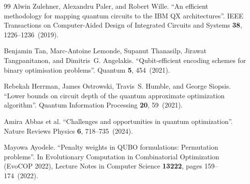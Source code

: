 \begin{thebibliography}{99}
Alwin Zulehner, Alexandru Paler, and Robert Wille.
\newblock ``An efficient methodology for mapping quantum circuits to the IBM QX architectures''.
\newblock IEEE Transactions on Computer-Aided Design of Integrated Circuits and Systems {\bf 38}, 1226--1236~(2019).

Benjamin Tan, Marc-Antoine Lemonde, Supanut Thanasilp, Jirawat Tangpanitanon, and Dimitris~G. Angelakis.
\newblock ``Qubit-efficient encoding schemes for binary optimisation problems''.
\newblock Quantum {\bf 5}, 454~(2021).

Rebekah Herrman, James Ostrowski, Travis~S. Humble, and George Siopsis.
\newblock ``Lower bounds on circuit depth of the quantum approximate optimization algorithm''.
\newblock Quantum Information Processing {\bf 20}, 59~(2021).

Amira Abbas et al.
\newblock ``Challenges and opportunities in quantum optimization''.
\newblock Nature Reviews Physics {\bf 6}, 718--735~(2024).

Mayowa Ayodele.
\newblock ``Penalty weights in QUBO formulations: Permutation problems''.
\newblock In Evolutionary Computation in Combinatorial Optimization (EvoCOP 2022), Lecture Notes in Computer Science {\bf 13222}, pages 159--174~(2022).

\end{thebibliography}
